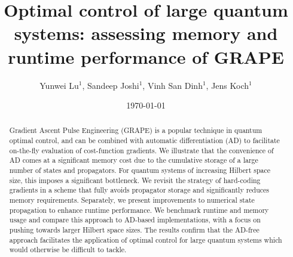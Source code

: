 \documentclass[letterpaper,10pt]{iopart}
\begin{document}
\title{Optimal control of large quantum systems: assessing memory and runtime performance of GRAPE}

\author{Yunwei Lu$^1$, Sandeep Joshi$^1$, Vinh San Dinh$^{1}$, Jens Koch$^1$}
\address{$^1$ Department of Physics and Astronomy, Northwestern University, Evanston, Illinois 60208, USA}



\date{\today}

\begin{abstract}
Gradient Ascent Pulse Engineering (GRAPE) is a popular technique in quantum optimal control, and can be combined with automatic differentiation (AD) to facilitate on-the-fly evaluation of cost-function gradients. We illustrate that the convenience of AD comes at a significant memory cost due to the cumulative storage of a large number of states and propagators. For quantum systems of increasing Hilbert space size, this imposes a significant bottleneck. We revisit the strategy of hard-coding gradients in a scheme that fully avoids propagator storage and significantly reduces memory requirements. Separately, we present improvements to numerical state propagation to enhance runtime performance. We benchmark runtime and memory usage and compare this approach to AD-based implementations, with a focus on pushing towards larger Hilbert space sizes. The results confirm that the AD-free approach facilitates the application of optimal control for large quantum systems which would otherwise be difficult to tackle.
\end{abstract}














\appendix


\end{document}
